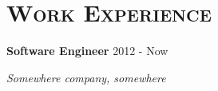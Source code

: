 \section*{\textsc{Work Experience}}

\textbf{Software Engineer}    \hfill      {\small 2012 - Now}

\emph{Somewhere company, somewhere}

\lipsumsentence[2-4]
\\